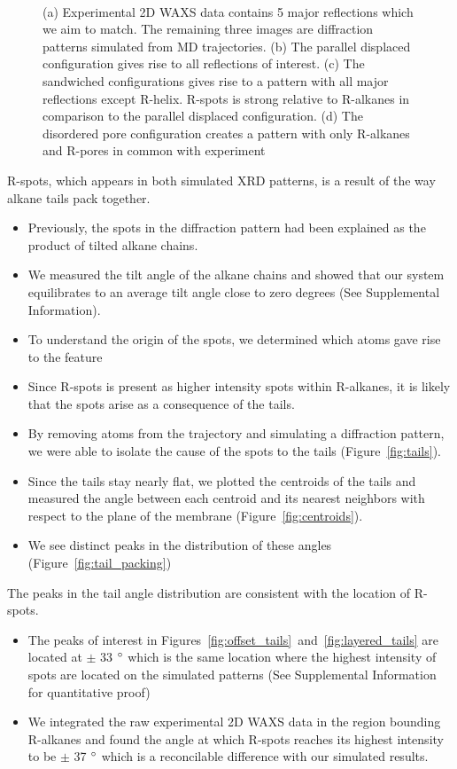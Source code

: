 \documentclass{article}
\begin{document}
\begin{figure}[ht]
\begin{subfigure}{0.14\linewidth}
  \end{subfigure}
  \caption{(a) Experimental 2D WAXS data contains 5 major reflections which we aim to match. The remaining
  three images are diffraction patterns simulated from MD trajectories. (b) The parallel displaced
  configuration gives rise to all reflections of interest. (c) The sandwiched configurations gives rise to a
  pattern with all major reflections except R-helix. R-spots is strong relative to R-alkanes in comparison
  to the parallel displaced configuration. (d) The disordered pore configuration creates a pattern with only
  R-alkanes and R-pores in common with experiment}~\label{fig:xrd}
  \end{figure}

  R-spots, which appears in both simulated XRD patterns, is a result of the way 
  alkane tails pack together.
  \begin{itemize}
  	\item Previously, the spots in the diffraction pattern had been explained 
	as the product of tilted alkane chains. %
	\item We measured the tilt angle of the alkane chains and showed that our 
	system equilibrates to an average tilt angle close to zero degrees (See Supplemental Information). 
	\item To understand the origin of the spots, we determined which atoms gave rise to the feature
	\item Since R-spots is present as higher intensity spots within R-alkanes, it is likely
        that the spots arise as a consequence of the tails. 
	\item By removing atoms from the trajectory and simulating a diffraction 
	pattern, we were able to isolate the cause of the spots to the tails (Figure~\ref{fig:tails}).
	\item Since the tails stay nearly flat, we plotted the centroids of the 
	tails and measured the angle between each centroid and its nearest neighbors
	with respect to the plane of the membrane (Figure~\ref{fig:centroids}).
	\item We see distinct peaks in the distribution of these angles (Figure~\ref{fig:tail_packing})
  \end{itemize}

  The peaks in the tail angle distribution are consistent with the location of R-spots.
  \begin{itemize}
	\item The peaks of interest in Figures~\ref{fig:offset_tails}~and~\ref{fig:layered_tails}
	are located at $\pm$ 33 $\degree$ which is the same location where the highest intensity
	of spots are located on the simulated patterns (See Supplemental Information for quantitative proof)
	\item We integrated the raw experimental 2D WAXS data in the region bounding R-alkanes 
        and found the angle at which R-spots reaches its highest intensity to be $\pm$ 37 $\degree$ which 
        is a reconcilable difference with our simulated results.  
  \end{itemize}
\end{document}
